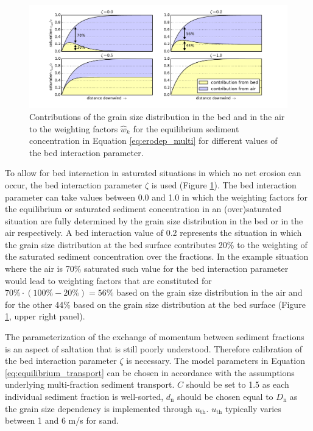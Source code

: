 \begin{figure}
  \centering
  \includegraphics[width=\columnwidth]{../Figures/bed_interaction_parameter}
  \caption{Contributions of the grain size distribution in the bed and
    in the air to the weighting factors $\hat{w}_k$ for the
    equilibrium sediment concentration in Equation
    \ref{eq:erodep_multi} for different values of the bed interaction
    parameter.}
  \label{fig:bed_interaction_parameter}
\end{figure}

To allow for bed interaction in saturated situations in which no net
erosion can occur, the bed interaction parameter $\zeta$ is used (Figure
\ref{fig:bed_interaction_parameter}). The bed interaction parameter
can take values between 0.0 and 1.0 in which the weighting factors for
the equilibrium or saturated sediment concentration in an
(over)saturated situation are fully determined by the grain size
distribution in the bed or in the air respectively. A bed interaction
value of 0.2 represents the situation in which the grain size
distribution at the bed surface contributes 20\% to the weighting of
the saturated sediment concentration over the fractions. In the
example situation where the air is 70\% saturated such value for the
bed interaction parameter would lead to weighting factors that are
constituted for $70\% \cdot (100\% - 20\%) = 56\%$ based on the grain
size distribution in the air and for the other 44\% based on the grain
size distribution at the bed surface (Figure
\ref{fig:bed_interaction_parameter}, upper right panel).

The parameterization of the exchange of momentum between sediment
fractions is an aspect of saltation that is still poorly
understood. Therefore calibration of the bed interaction parameter
$\zeta$ is necessary. The model parameters in Equation
\ref{eq:equilibrium_transport} can be chosen in accordance with the
assumptions underlying multi-fraction sediment transport. $C$ should
be set to 1.5 as each individual sediment fraction is well-sorted,
$d_{\mathrm{n}}$ should be chosen equal to $D_{\mathrm{n}}$ as the
grain size dependency is implemented through
$u_{\mathrm{th}}$. $u_{\mathrm{th}}$ typically varies between 1 and 6
m/s for sand.

